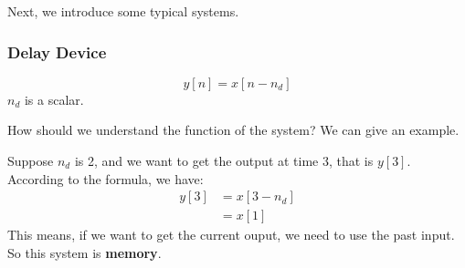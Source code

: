     Next, we introduce some typical systems.

    \subsubsection{Delay Device}
        \begin{equation}
            y[n] = x[n-n_d] 
        \end{equation}
    $n_d$ is a scalar.

    How should we understand the function of the system? We can give an example.

    Suppose $n_d$ is 2, and we want to get the output at time 3, that is $y[3]$. 
    According to the formula, we have:
        \begin{equation}
            \begin{aligned}
                y[3] &= x[3-n_d]\\
                     &= x[1]
            \end{aligned}
        \end{equation}
    This means, if we want to get the current ouput, we need to use the past input. 
    So this system is \textbf{memory}. 

